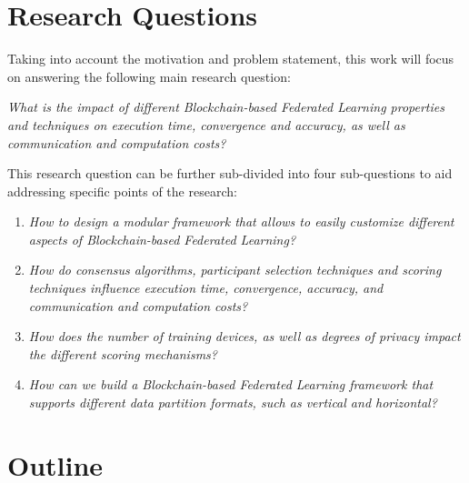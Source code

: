 \section{Research Questions}

Taking into account the motivation and problem statement, this work will focus on answering the following main research question:

\begin{center}
    \textit{What is the impact of different Blockchain-based Federated Learning properties and techniques on execution time, convergence and accuracy, as well as communication and computation costs?}
\end{center}

This research question can be further sub-divided into four sub-questions to aid addressing specific points of the research:

\begin{enumerate}
    \item \textit{How to design a modular framework that allows to easily customize different aspects of Blockchain-based Federated Learning?}
    
    \item \textit{How do consensus algorithms, participant selection techniques and scoring techniques influence execution time, convergence, accuracy, and communication and computation costs?}
    
    \item \textit{How does the number of training devices, as well as degrees of privacy impact the different scoring mechanisms?}
    
    \item \textit{How can we build a Blockchain-based Federated Learning framework that supports different data partition formats, such as vertical and horizontal?}
\end{enumerate}

\section{Outline}

